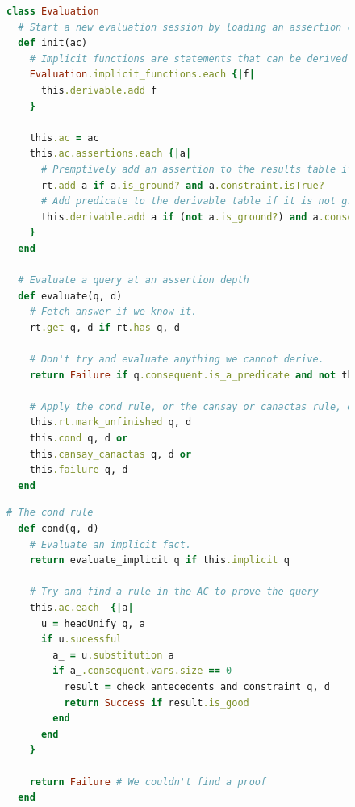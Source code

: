 \documentclass{scrartcl}
\begin{document}
\begin{figure}
  \begin{minipage}{0.5\linewidth}
    \begin{lstlisting}[language=Ruby,basicstyle=\footnotesize\ttfamily]
class Evaluation
  # Start a new evaluation session by loading an assertion context
  def init(ac)
    # Implicit functions are statements that can be derived without additional AppPAL predicates.  They are marked as derivable, as a statement formed from from one is derivable by inspection.
    Evaluation.implicit_functions.each {|f|
      this.derivable.add f
    }

    this.ac = ac
    this.ac.assertions.each {|a|
      # Premptively add an assertion to the results table if it is a ground fact
      rt.add a if a.is_ground? and a.constraint.isTrue?
      # Add predicate to the derivable table if it is not ground (i.e. there is a potential variable assignment which could be true)
      this.derivable.add a if (not a.is_ground?) and a.consequent.is_a_predicate?
    }
  end

  # Evaluate a query at an assertion depth
  def evaluate(q, d)
    # Fetch answer if we know it.
    rt.get q, d if rt.has q, d

    # Don't try and evaluate anything we cannot derive.
    return Failure if q.consequent.is_a_predicate and not this.derivable.contains q

    # Apply the cond rule, or the cansay or canactas rule, else fail.
    this.rt.mark_unfinished q, d
    this.cond q, d or
    this.cansay_canactas q, d or
    this.failure q, d
  end
  \end{lstlisting}
\end{minipage}
  \begin{minipage}{0.5\linewidth}
    \begin{lstlisting}[language=Ruby,basicstyle=\footnotesize\ttfamily]
  # The cond rule
  def cond(q, d)
    # Evaluate an implicit fact.
    return evaluate_implicit q if this.implicit q

    # Try and find a rule in the AC to prove the query
    this.ac.each  {|a|
      u = headUnify q, a
      if u.sucessful
        a_ = u.substitution a
        if a_.consequent.vars.size == 0
          result = check_antecedents_and_constraint q, d
          return Success if result.is_good
        end
      end
    }

    return Failure # We couldn't find a proof
  end


\end{lstlisting}
\end{minipage}
\end{figure}
\end{document}
